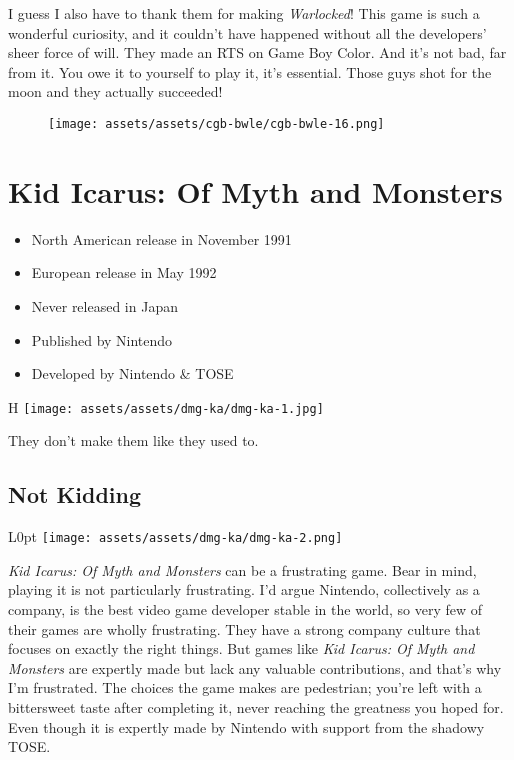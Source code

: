 \documentclass{book}
\begin{document}
I guess I also have to thank them for making \emph{Warlocked}! This game is such a wonderful curiosity, and it couldn’t have happened without all the developers’ sheer force of will. They made an RTS on Game Boy Color. And it’s not bad, far from it. You owe it to yourself to play it, it’s essential. Those guys shot for the moon and they actually succeeded!

\begin{figure}[hbt]
\vskip 10pt
\centering \texttt{[image: assets/assets/cgb-bwle/cgb-bwle-16.png]}
\vskip 6pt
\end{figure}


\begingroup \chapter*{Kid Icarus: Of Myth and Monsters} \endgroup

\begin{itemize} \setlength\itemsep{-0.4em}
\item North American release in November 1991
\item European release in May 1992
\item Never released in Japan
\item Published by Nintendo
\item Developed by Nintendo \& TOSE
\end{itemize}\noindent

\begin{wrapfigure}{H}{\linewidth}
\vskip 4pt
\centering \texttt{[image: assets/assets/dmg-ka/dmg-ka-1.jpg]}\par\pagetwodescription They don’t make them like they used to.\end{wrapfigure}
\clearpage

\FloatBarrier\needspace{5pt}\section*{Not Kidding}\nopagebreak[4]

\begin{wrapfigure}{L}{0pt} \texttt{[image: assets/assets/dmg-ka/dmg-ka-2.png]}\end{wrapfigure}
\emph{Kid Icarus: Of Myth and Monsters} can be a frustrating game. Bear in mind, playing it is not particularly frustrating. I’d argue Nintendo, collectively as a company, is the best video game developer stable in the world, so very few of their games are wholly frustrating. They have a strong company culture that focuses on exactly the right things. But games like \emph{Kid Icarus: Of Myth and Monsters} are expertly made but lack any valuable contributions, and that’s why I’m frustrated. The choices the game makes are pedestrian; you’re left with a bittersweet taste after completing it, never reaching the greatness you hoped for. Even though it is expertly made by Nintendo with support from the shadowy TOSE.
\end{document}

